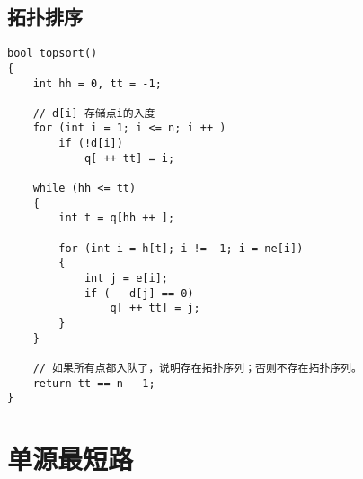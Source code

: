 \documentclass[12pt,a4paper,UTF16]{ctexbook}
\theoremstyle{plain}
\begin{document}
\subsection{拓扑排序}
\begin{lstlisting}
bool topsort()
{
    int hh = 0, tt = -1;

    // d[i] 存储点i的入度
    for (int i = 1; i <= n; i ++ )
        if (!d[i])
            q[ ++ tt] = i;

    while (hh <= tt)
    {
        int t = q[hh ++ ];

        for (int i = h[t]; i != -1; i = ne[i])
        {
            int j = e[i];
            if (-- d[j] == 0)
                q[ ++ tt] = j;
        }
    }

    // 如果所有点都入队了，说明存在拓扑序列；否则不存在拓扑序列。
    return tt == n - 1;
}
\end{lstlisting}

\section{单源最短路}
\end{document}
